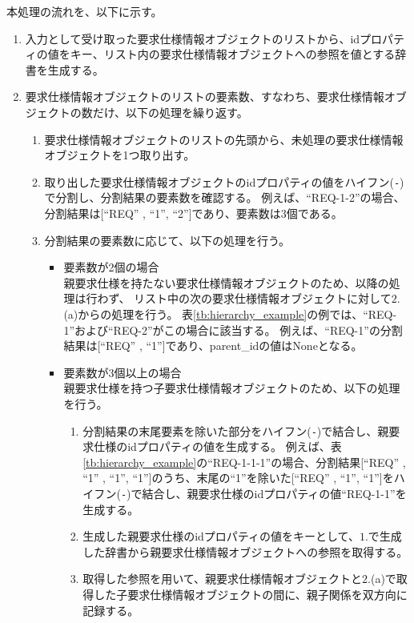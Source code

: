 本処理の流れを、以下に示す。
\begin{enumerate}
    \item 入力として受け取った要求仕様情報オブジェクトのリストから、idプロパティの値をキー、リスト内の要求仕様情報オブジェクトへの参照を値とする辞書を生成する。
    \item 要求仕様情報オブジェクトのリストの要素数、すなわち、要求仕様情報オブジェクトの数だけ、以下の処理を繰り返す。
    \begin{enumerate}
        \item 要求仕様情報オブジェクトのリストの先頭から、未処理の要求仕様情報オブジェクトを1つ取り出す。
        \item 取り出した要求仕様情報オブジェクトのidプロパティの値をハイフン(\texttt{-})で分割し、分割結果の要素数を確認する。
        例えば、``REQ-1-2''の場合、分割結果は[``REQ'' , ``1'', ``2'']であり、要素数は3個である。
        \item 分割結果の要素数に応じて、以下の処理を行う。
        \begin{itemize}
            \item 要素数が2個の場合\\
            親要求仕様を持たない要求仕様情報オブジェクトのため、以降の処理は行わず、
            リスト中の次の要求仕様情報オブジェクトに対して$2$.(a)からの処理を行う。
            表\ref{tb:hierarchy_example}の例では、``REQ-1''および``REQ-2''がこの場合に該当する。
            例えば、``REQ-1''の分割結果は[``REQ'' , ``1'']であり、parent\_idの値はNoneとなる。
            \item 要素数が3個以上の場合\\
            親要求仕様を持つ子要求仕様情報オブジェクトのため、以下の処理を行う。
            \begin{enumerate}
                \item 分割結果の末尾要素を除いた部分をハイフン(\texttt{-})で結合し、親要求仕様のidプロパティの値を生成する。
                例えば、表\ref{tb:hierarchy_example}の``REQ-1-1-1''の場合、分割結果[``REQ'' , ``1'' , ``1'', ``1'']のうち、末尾の``1''を除いた[``REQ'' , ``1'', ``1'']をハイフン(\texttt{-})で結合し、親要求仕様のidプロパティの値``REQ-1-1''を生成する。
                \item 生成した親要求仕様のidプロパティの値をキーとして、$1$.で生成した辞書から親要求仕様情報オブジェクトへの参照を取得する。
                \item 取得した参照を用いて、親要求仕様情報オブジェクトと$2$.(a)で取得した子要求仕様情報オブジェクトの間に、親子関係を双方向に記録する。

\end{enumerate}
\end{itemize}
\end{enumerate}
\end{enumerate}
